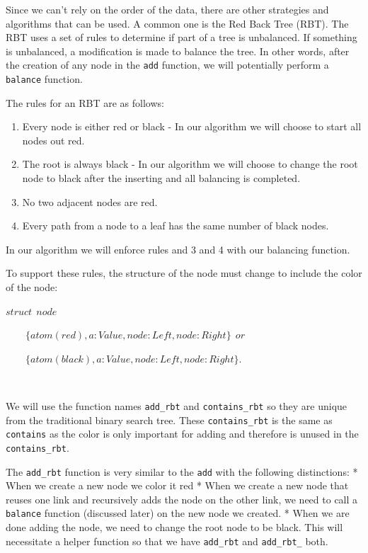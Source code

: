 \documentclass[
]{book}
\providecommand{\tightlist}{%
  \setlength{\itemsep}{0pt}\setlength{\parskip}{0pt}}
\begin{document}
Since we can't rely on the order of the data, there are other strategies and algorithms that can be used. A common one is the Red Back Tree (RBT). The RBT uses a set of rules to determine if part of a tree is unbalanced. If something is unbalanced, a modification is made to balance the tree. In other words, after the creation of any node in the \texttt{add} function, we will potentially perform a \texttt{balance} function.

The rules for an RBT are as follows:

\begin{enumerate}
\def\labelenumi{\arabic{enumi}.}
\tightlist
\item
  Every node is either red or black - In our algorithm we will choose to start all nodes out red.
\item
  The root is always black - In our algorithm we will choose to change the root node to black after the inserting and all balancing is completed.
\item
  No two adjacent nodes are red.
\item
  Every path from a node to a leaf has the same number of black nodes.
\end{enumerate}

In our algorithm we will enforce rules and 3 and 4 with our balancing function.

To support these rules, the structure of the node must change to include the color of the node:

\begin{formulabox}
\(struct ~ ~ node\)

\(\quad \quad \lbrace atom(red), a:Value, node:\mathit{Left}, node:Right \rbrace ~ ~ or\)

\(\quad \quad \lbrace atom(black), a:Value, node:\mathit{Left}, node:Right \rbrace.\)

\end{formulabox}

\(\nonumber\)

We will use the function names \texttt{add\_rbt} and \texttt{contains\_rbt} so they are unique from the traditional binary search tree. These \texttt{contains\_rbt} is the same as \texttt{contains} as the color is only important for adding and therefore is unused in the \texttt{contains\_rbt}.

The \texttt{add\_rbt} function is very similar to the \texttt{add} with the following distinctions:
* When we create a new node we color it red
* When we create a new node that reuses one link and recursively adds the node on the other link, we need to call a \texttt{balance} function (discussed later) on the new node we created.
* When we are done adding the node, we need to change the root node to be black. This will necessitate a helper function so that we have \texttt{add\_rbt} and \texttt{add\_rbt\_} both.
\end{document}
